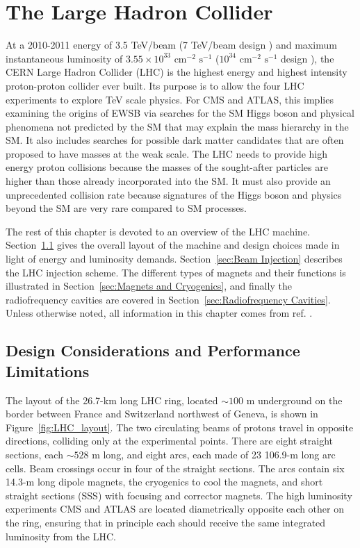 \documentclass[dissertation.tex]{subfiles}
\begin{document}
\chapter{The Large Hadron Collider}
\label{chap:The Large Hadron Collider}

At a 2010-2011 energy of 3.5 TeV/beam (7 TeV/beam design \cite{LHC_paper}) and maximum instantaneous luminosity of $3.55 \times 10^{33}\mbox{ cm}^{-2}\mbox{ s}^{-1}$ \cite{CMS_2011_summary} ($10^{34}\mbox{ cm}^{-2}\mbox{ s}^{-1}$ design \cite{LHC_paper}), the CERN Large Hadron Collider (LHC) is the highest energy and highest intensity proton-proton collider ever built.  Its purpose is to allow the four LHC experiments to explore TeV scale physics.  For CMS and ATLAS, this implies examining the origins of EWSB via searches for the SM Higgs boson and physical phenomena not predicted by the SM that may explain the mass hierarchy in the SM.  It also includes searches for possible dark matter candidates that are often proposed to have masses at the weak scale.  The LHC needs to provide high energy proton collisions because the masses of the sought-after particles are higher than those already incorporated into the SM.  It must also provide an unprecedented collision rate because signatures of the Higgs boson and physics beyond the SM are very rare compared to SM processes.

The rest of this chapter is devoted to an overview of the LHC machine.  Section~\ref{sec:Design Considerations and Performance Limitations} gives the overall layout of the machine and design choices made in light of energy and luminosity demands.  Section~\ref{sec:Beam Injection} describes the LHC injection scheme.  The different types of magnets and their functions is illustrated in Section~\ref{sec:Magnets and Cryogenics}, and finally the radiofrequency cavities are covered in Section~\ref{sec:Radiofrequency Cavities}.  Unless otherwise noted, all information in this chapter comes from ref. \cite{LHC_paper}.

\section{Design Considerations and Performance Limitations}
\label{sec:Design Considerations and Performance Limitations}

The layout of the 26.7-km long \cite{LHC_public} LHC ring, located $\sim100$ m underground on the border between France and Switzerland northwest of Geneva, is shown in Figure~\ref{fig:LHC_layout}.  The two circulating beams of protons travel in opposite directions, colliding only at the experimental points.  There are eight straight sections, each $\sim528$ m long, and eight arcs, each made of 23 106.9-m long arc cells.  Beam crossings occur in four of the straight sections.  The arcs contain six 14.3-m long dipole magnets, the cryogenics to cool the magnets, and short straight sections (SSS) with focusing and corrector magnets.  The high luminosity experiments CMS and ATLAS are located diametrically opposite each other on the ring, ensuring that in principle each should receive the same integrated luminosity from the LHC.
\end{document}
